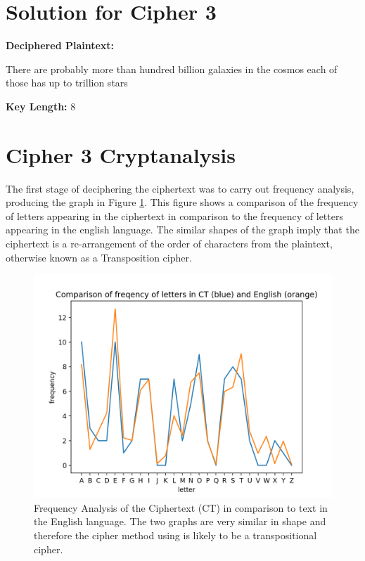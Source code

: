 \documentclass[a4paper,11pt]{article}
\begin{document}
\section{Solution for Cipher 3} \label{Solution for Cipher 3}
	{\bfseries{Deciphered Plaintext:}} 
	
	There are probably more than hundred billion galaxies in the cosmos each of those has up to trillion stars
	
	{\bfseries{Key Length:}} 8

\section{Cipher 3 Cryptanalysis} \label{Cipher 3 Cryptanalysis}	

	The first stage of deciphering the ciphertext was to carry out frequency analysis, producing the graph in Figure \ref{q3freq}. This figure shows a comparison of the frequency of letters appearing in the ciphertext in comparison to the frequency of letters appearing in the english language. The similar shapes of the graph imply that the ciphertext is a re-arrangement of the order of characters from the plaintext, otherwise known as a Transposition cipher.

		\begin{figure}[h]
			\centering
			\includegraphics[width = 12cm]{img/q3freq}
			\captionsetup{width = 13cm}
			\caption{Frequency Analysis of the Ciphertext (CT) in comparison to text in the English language. The two graphs are very similar in shape and therefore the cipher method using is likely to be a transpositional cipher.}
			\label{q3freq}
		\end{figure}
\end{document}
